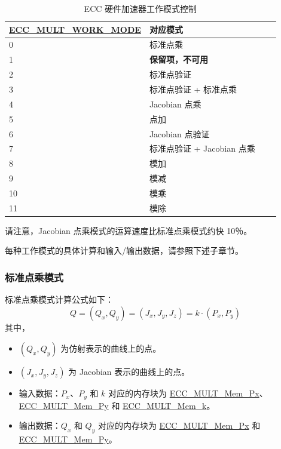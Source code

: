\documentclass[main\_\_CN.tex]{subfiles}
\begin{document}
\begin{table}[H]
    \centering
    \caption{ECC 硬件加速器工作模式控制}
    \label{tab:ecc-work-mode}
    \begin{tabular}{|l|l|l|l|}
    \hline
        \rowcolor{lightgray}
        \textbf{\hyperref[fielddesc:ECCMULTWORKMODE]{ECC\_MULT\_WORK\_MODE}} & \textbf{对应模式}  \\ \hline
        0  & 标准点乘                          \\\hline
        1  & \textbf{保留项，不可用}                \\\hline
        2  & 标准点验证                   \\\hline
        3  & 标准点验证 + 标准点乘            \\\hline
        4  & Jacobian 点乘                \\\hline
        5  & 点加                       \\\hline
        6  & Jacobian 点验证                  \\\hline
        7  & 标准点验证 + Jacobian 点乘        \\\hline
        8  & 模加                       \\\hline
        9  & 模减                     \\\hline
        10 & 模乘                  \\\hline
        11 & 模除                         \\\hline
    \end{tabular}
\end{table}


\begin{tiplisting}
请注意，Jacobian 点乘模式的运算速度比标准点乘模式约快 10％。
\end{tiplisting}


每种工作模式的具体计算和输入/输出数据，请参照下述子章节。

\subsubsection{标准点乘模式}

标准点乘模式计算公式如下：
\[
Q = (Q_x,Q_y) = (J_x,J_y,J_z) = k \cdot (P_x,P_y)
\]
其中，
\begin{itemize}
    \item $(Q_x,Q_y)$ 为仿射表示的曲线上的点。
    \item $(J_x,J_y,J_z)$ 为 Jacobian 表示的曲线上的点。
    \item 输入数据：$P_x$、$P_y$ 和 $k$ 对应的内存块为 \hyperref[tab:ecc-memory]{ECC\_MULT\_Mem\_Px}、\hyperref[tab:ecc-memory]{ECC\_MULT\_Mem\_Py} 和 \hyperref[tab:ecc-memory]{ECC\_MULT\_Mem\_k}。
    \item 输出数据：$Q_x$ 和 $Q_y$ 对应的内存块为 \hyperref[tab:ecc-memory]{ECC\_MULT\_Mem\_Px} 和 \hyperref[tab:ecc-memory]{ECC\_MULT\_Mem\_Py}。
\end{itemize}
\end{document}
